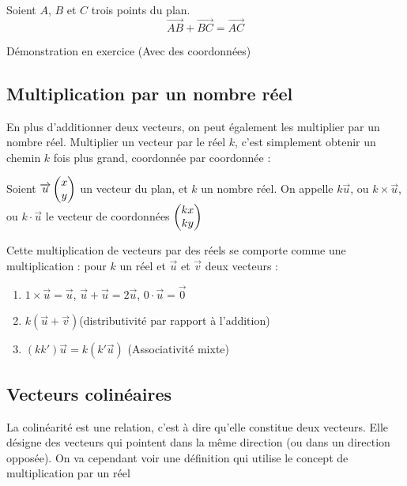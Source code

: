 \documentclass[10pt,a4paper,oneside]{book}
\begin{document}
\begin{prop}
  Soient $A$, $B$ et $C$ trois points du plan. 
  \[ \overrightarrow{AB} + \overrightarrow{BC} = \overrightarrow{AC}\]
\end{prop}

Démonstration en exercice (Avec des coordonnées)

\subsection{Multiplication par un nombre réel}

En plus d'additionner deux vecteurs, on peut également les multiplier par un nombre réel. Multiplier un vecteur par le réel $k$, c'est simplement obtenir un chemin $k$ fois plus grand, coordonnée par coordonnée :

\begin{de}
  Soient $\overrightarrow{u}  \begin{pmatrix} x\\ y \end{pmatrix}$ un vecteur du plan, et $k$ un nombre réel. On appelle $k \overrightarrow{u}$, ou $k \times \overrightarrow{u}$, ou $k \cdot \overrightarrow{u}$ le vecteur de coordonnées $ \begin{pmatrix} kx\\ ky \end{pmatrix}$  
\end{de}

\begin{prop}
  Cette multiplication de vecteurs par des réels se comporte comme une multiplication : pour $k$ un réel et $\overrightarrow{u}$ et $\overrightarrow{v}$ deux vecteurs : 
  \begin{enumerate}
    \item $1 \times \overrightarrow{u} = \overrightarrow{u}$, $\overrightarrow{u} + \overrightarrow{u} = 2 \overrightarrow{u}$, $0 \cdot \overrightarrow{u}= \overrightarrow{0}$
    \item $k(\overrightarrow{u} + \overrightarrow{v})$(distributivité par rapport à l'addition)
    \item $(kk')\overrightarrow{u} = k(k'\overrightarrow{u})$ (Associativité mixte)
  \end{enumerate}
\end{prop}

\subsection{Vecteurs colinéaires}

La colinéarité est une relation, c'est à dire qu'elle constitue deux vecteurs. Elle désigne des vecteurs qui pointent dans la même direction (ou dans un direction opposée). 
On va cependant voir une définition qui utilise le concept de multiplication par un réel
\end{document}
